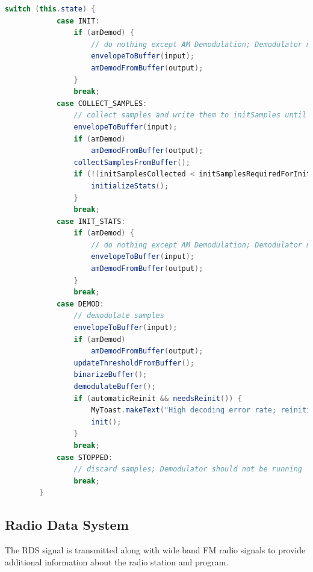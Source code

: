 \begin{lstlisting}[label=lst:morse_demod_method, caption=The demodulate method of the new Morse demodulator, language=java]
        switch (this.state) {
            case INIT:
                if (amDemod) {
                    // do nothing except AM Demodulation; Demodulator might be in inconsistent state
                    envelopeToBuffer(input);
                    amDemodFromBuffer(output);
                }
                break;
            case COLLECT_SAMPLES:
                // collect samples and write them to initSamples until we have enough
                envelopeToBuffer(input);
                if (amDemod)
                    amDemodFromBuffer(output);
                collectSamplesFromBuffer();
                if (!(initSamplesCollected < initSamplesRequiredForInit)) {
                    initializeStats();
                }
                break;
            case INIT_STATS:
                if (amDemod) {
                    // do nothing except AM Demodulation; Demodulator might be in inconsistent state
                    envelopeToBuffer(input);
                    amDemodFromBuffer(output);
                }
                break;
            case DEMOD:
                // demodulate samples
                envelopeToBuffer(input);
                if (amDemod)
                    amDemodFromBuffer(output);
                updateThresholdFromBuffer();
                binarizeBuffer();
                demodulateBuffer();
                if (automaticReinit && needsReinit()) {
                    MyToast.makeText("High decoding error rate; reinitializing...", Toast.LENGTH_LONG);
                    init();
                }
                break;
            case STOPPED:
                // discard samples; Demodulator should not be running
                break;
        }
\end{lstlisting}









\subsection{Radio Data System \label{sec:rds}}

The \ac{RDS} signal is transmitted along with wide band \ac{FM}
radio signals to provide additional information about the
radio station and program.

